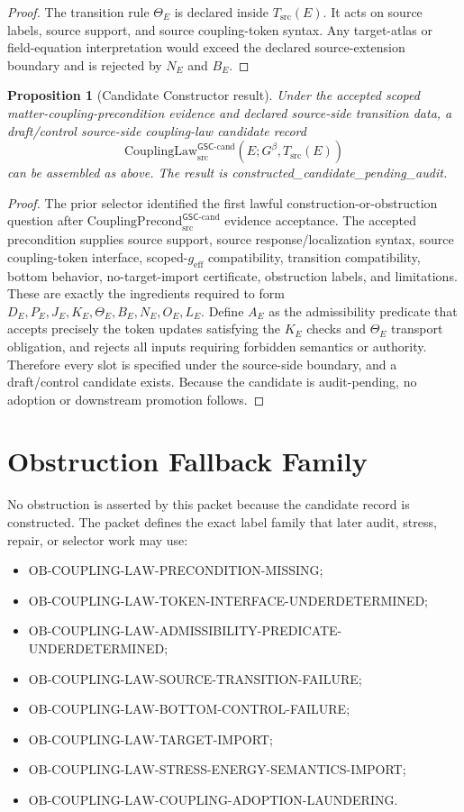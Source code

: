 \documentclass[11pt]{article}
\newcommand{\Gbeta}{G^\beta}
\newcommand{\geff}{g_{\mathrm{eff}}}
\newcommand{\CouplingPrecond}{\mathrm{CouplingPrecond}^{\mathsf{GSC}\mbox{-}\mathrm{cand}}_{\mathrm{src}}}
\newcommand{\CouplingLaw}{\mathrm{CouplingLaw}^{\mathsf{GSC}\mbox{-}\mathrm{cand}}_{\mathrm{src}}}
\newcommand{\OBLAW}{\mathrm{OB}\mbox{-}\mathrm{COUPLING}\mbox{-}\mathrm{LAW}}
\newtheorem{proposition}{Proposition}
\begin{document}
\begin{proof}
The transition rule \(\Theta_E\) is declared inside \(T_{\mathrm{src}}(E)\).
It acts on source labels, source support, and source coupling-token syntax.
Any target-atlas or field-equation interpretation would exceed the declared
source-extension boundary and is rejected by \(N_E\) and \(B_E\).
\end{proof}

\begin{proposition}[Candidate Constructor result]
Under the accepted scoped matter-coupling-precondition evidence and declared
source-side transition data, a draft/control source-side coupling-law
candidate record
\[
  \CouplingLaw(E;\Gbeta,T_{\mathrm{src}}(E))
\]
can be assembled as above. The result is
\emph{constructed\_candidate\_pending\_audit}.
\end{proposition}

\begin{proof}
The prior selector identified the first lawful construction-or-obstruction
question after \(\CouplingPrecond\) evidence acceptance. The accepted
precondition supplies source support, source response/localization syntax,
source coupling-token interface, scoped-\(\geff\) compatibility, transition
compatibility, bottom behavior, no-target-import certificate, obstruction
labels, and limitations. These are exactly the ingredients required to form
\(D_E,P_E,J_E,K_E,\Theta_E,B_E,N_E,O_E,L_E\). Define \(A_E\) as the
admissibility predicate that accepts precisely the token updates satisfying
the \(K_E\) checks and \(\Theta_E\) transport obligation, and rejects all
inputs requiring forbidden semantics or authority. Therefore every slot is
specified under the source-side boundary, and a draft/control candidate
exists. Because the candidate is audit-pending, no adoption or downstream
promotion follows.
\end{proof}

\section{Obstruction Fallback Family}

No obstruction is asserted by this packet because the candidate record is
constructed. The packet defines the exact label family that later audit,
stress, repair, or selector work may use:

\begin{itemize}[leftmargin=*]
  \item \(\OBLAW\)-PRECONDITION-MISSING;
  \item \(\OBLAW\)-TOKEN-INTERFACE-UNDERDETERMINED;
  \item \(\OBLAW\)-ADMISSIBILITY-PREDICATE-UNDERDETERMINED;
  \item \(\OBLAW\)-SOURCE-TRANSITION-FAILURE;
  \item \(\OBLAW\)-BOTTOM-CONTROL-FAILURE;
  \item \(\OBLAW\)-TARGET-IMPORT;
  \item \(\OBLAW\)-STRESS-ENERGY-SEMANTICS-IMPORT;
  \item \(\OBLAW\)-COUPLING-ADOPTION-LAUNDERING.
\end{itemize}
\end{document}
